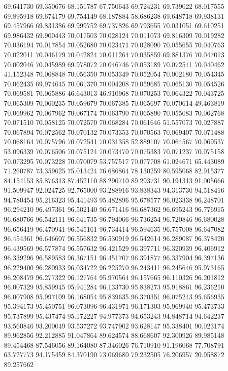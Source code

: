 69.641730
69.350676
68.151787
67.750643
69.724231
69.739022
68.017555
69.895918
69.674179
69.754149
68.187884
58.686238
69.648718
69.938131
69.457966
69.831386
69.999752
69.737826
69.793655
70.031051
69.610251
69.986432
69.900443
70.017503
70.028124
70.011073
69.816309
70.019282
70.036194
70.017854
70.052680
70.023471
70.028090
70.055655
70.040763
70.022011
70.046179
70.042824
70.011264
70.035859
69.881376
70.047013
70.002046
70.045989
69.978072
70.046746
70.053189
70.072541
70.040462
41.152348
70.068848
70.056350
70.053349
70.052054
70.002180
70.054345
70.062435
69.974645
70.061370
70.004208
70.059685
70.065130
70.054526
70.069581
70.065886
46.643013
46.910968
70.070253
70.064322
70.043725
70.065309
70.060235
70.059679
70.067385
70.065697
70.070614
49.463819
70.069962
70.067962
70.067174
70.063790
70.065890
70.055083
70.062768
70.071510
70.058125
70.072570
70.068284
70.061646
51.557073
70.027887
70.067894
70.072562
70.070132
70.073353
70.070563
70.069407
70.071488
70.068164
70.075796
70.072541
70.031358
52.889107
70.064567
70.069537
53.096339
70.076506
70.075124
70.073470
70.075383
70.071237
70.075158
70.073295
70.073228
70.070079
53.757517
70.077708
61.024671
65.443089
71.260787
73.359625
75.013424
76.686864
78.130259
80.595068
82.915377
84.154153
85.876313
87.452110
88.290710
89.293731
90.191313
91.005666
91.509947
92.024725
92.765000
93.288916
93.838343
94.313730
94.518416
94.780454
95.216323
95.441493
95.482896
95.678577
96.023338
96.248701
96.294210
96.497361
96.502140
96.671416
96.687362
96.695243
96.776915
96.680766
96.542111
96.641735
96.794066
96.736254
96.720846
96.680028
96.656419
96.470941
96.545161
96.734414
96.594635
96.757008
96.647082
96.454361
96.646607
96.556832
96.530919
96.542614
96.289087
96.378420
96.439569
96.577874
96.557632
96.421529
96.397711
96.320939
96.406912
96.339296
96.589583
96.367151
96.451707
96.391877
96.337904
96.397136
96.229400
96.280933
96.034722
96.225270
96.243411
96.245646
95.973165
96.208479
96.277322
96.127764
95.970564
96.157665
96.110326
96.201812
96.007329
95.859945
95.941284
96.133730
95.838273
95.918861
96.236210
96.007908
95.997109
96.168054
95.839635
96.370351
96.075243
95.656935
95.394173
95.450751
96.073096
96.431971
96.171303
95.969940
95.473733
95.737899
95.437474
95.172227
94.977373
94.653243
94.848714
94.642237
93.560846
93.200049
93.537272
93.747902
93.628147
95.338401
90.023174
89.962856
92.212885
91.047864
89.624574
88.668607
92.300926
89.985148
89.454468
87.546056
89.164080
87.346026
76.710910
91.196068
77.708791
63.727773
94.175459
84.370190
73.069680
79.232505
76.206957
20.958872
89.257662
